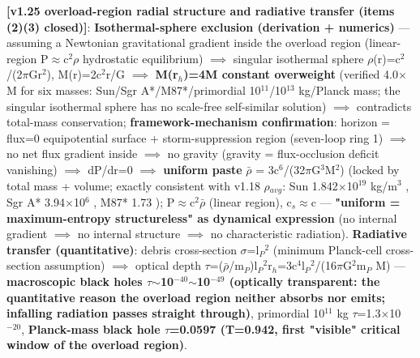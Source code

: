 \documentclass[12pt]{article}
\newcommand{\mtag}[1]{\textbf{[#1]}}
\newcommand{\up}[1]{\ensuremath{^{#1}}}
\newcommand{\down}[1]{\ensuremath{_{#1}}}
\begin{document}
\textbf{\mtag{v1.25 overload-region radial structure and radiative transfer (items (2)(3) closed)}}: \textbf{Isothermal-sphere exclusion (derivation + numerics)} --- assuming a Newtonian gravitational gradient inside the overload region (linear-region P\ensuremath{\approx}c\up{2}\ensuremath{\rho} hydrostatic equilibrium) \ensuremath{\implies} singular isothermal sphere \ensuremath{\rho}(r)=c\up{2}/(2\ensuremath{\pi}Gr\up{2}), M(r)=2c\up{2}r/G \ensuremath{\implies} \textbf{M(r\down{h})=4M constant overweight} (verified 4.0\ensuremath{\times}M for six masses: Sun/Sgr A*/M87*/primordial 10\up{11}/10\up{13} kg/Planck mass; the singular isothermal sphere has no scale-free self-similar solution) \ensuremath{\implies} contradicts total-mass conservation; \textbf{framework-mechanism confirmation}: horizon = flux=0 equipotential surface + storm-suppression region (seven-loop ring 1) \ensuremath{\implies} no net flux gradient inside \ensuremath{\implies} no gravity (gravity = flux-occlusion deficit vanishing) \ensuremath{\implies} dP/dr=0 \ensuremath{\implies} \textbf{uniform paste} \ensuremath{\bar{\rho}} = 3c\up{6}/(32\ensuremath{\pi}G\up{3}M\up{2}) (locked by total mass + volume; exactly consistent with v1.18 \ensuremath{\rho}\down{avg}: Sun 1.842\ensuremath{\times}10\up{19} kg/m\up{3} \checkmark, Sgr A* 3.94\ensuremath{\times}10\up{6} \checkmark, M87* 1.73 \checkmark); P\ensuremath{\approx}c\up{2}\ensuremath{\bar{\rho}} (linear region), c\down{s}\ensuremath{\approx}c --- \textbf{"uniform = maximum-entropy structureless" as dynamical expression} (no internal gradient \ensuremath{\implies} no internal structure \ensuremath{\implies} no characteristic radiation). \textbf{Radiative transfer (quantitative)}: debris cross-section \ensuremath{\sigma}=l\down{P}\up{2} (minimum Planck-cell cross-section assumption) \ensuremath{\implies} optical depth \ensuremath{\tau}=(\ensuremath{\bar{\rho}}/m\down{P})l\down{P}\up{2}r\down{h}=3c\up{4}l\down{P}\up{2}/(16\ensuremath{\pi}G\up{2}m\down{P} M) --- \textbf{macroscopic black holes \ensuremath{\tau}\ensuremath{\sim}10\up{-40}\ensuremath{\sim}10\up{-49} (optically transparent: the quantitative reason the overload region neither absorbs nor emits; infalling radiation passes straight through)}, primordial 10\up{11} kg \ensuremath{\tau}=1.3\ensuremath{\times}10\up{-20}, \textbf{Planck-mass black hole \ensuremath{\tau}=0.0597 (T=0.942, first "visible" critical window of the overload region)}.
\end{document}
